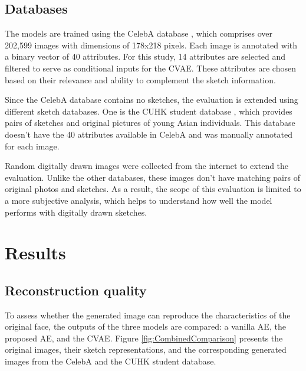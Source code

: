 \documentclass{IEEEcsmag}
\begin{document}
\subsection{Databases}
\label{subsec:databases}

The models are trained using the CelebA database \cite{liu2015}, which comprises over 202,599 images with dimensions of 178x218 pixels. Each image is annotated with a binary vector of 40 attributes. For this study, 14 attributes are selected and filtered to serve as conditional inputs for the CVAE. These attributes are chosen based on their relevance and ability to complement the sketch information. 

Since the CelebA database contains no sketches, the evaluation is extended using different sketch databases. One is the CUHK student database \cite{zhang_coupled_2011}, which provides pairs of sketches and original pictures of young Asian individuals. This database doesn't have the 40 attributes available in CelebA and was manually annotated for each image.

Random digitally drawn images were collected from the internet to extend the evaluation. Unlike the other databases, these images don't have matching pairs of original photos and sketches. As a result, the scope of this evaluation is limited to a more subjective analysis, which helps to understand how well the model performs with digitally drawn sketches.

\section{Results}
\label{sec:results}

\subsection{Reconstruction quality}
\label{subsec:reconstructionQuality}

To assess whether the generated image can reproduce the characteristics of the original face, the outputs of the three models are compared: a vanilla AE, the proposed AE, and the CVAE. Figure \ref{fig:CombinedComparison} presents the original images, their sketch representations, and the corresponding generated images from the CelebA and the CUHK student database.
\end{document}
